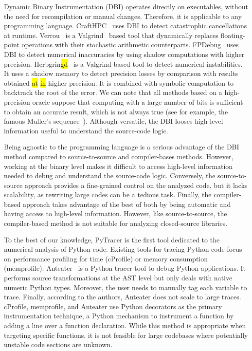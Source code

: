 \documentclass[10pt,journal,compsoc]{IEEEtran}
\newcommand{\pytracer}[0]{PyTracer\xspace}
\DeclareRobustCommand{\add}[1]{{\sethlcolor{lightgreen}\hl{#1}}}
\DeclareRobustCommand{\remove}[1]{{\sethlcolor{lightred}\hl{#1}}}
\begin{document}
Dynamic Binary Instrumentation (DBI) operates directly on executables, without
the need for recompilation or manual changes. Therefore, it is applicable to any
programming language. CraftHPC~\cite{lam2013dynamic} uses DBI to detect
catastrophic cancellations at runtime. Verrou~\cite{fevotte2016verrou} is a
Valgrind~\cite{nethercote2007valgrind} based tool that dynamically replaces
floating-point operations with their stochastic arithmetic counterparts.
FPDebug~\cite{benz2012dynamic} uses DBI to detect numerical inaccuracies by
using shadow computations with higher precision.
Herbgrin\remove{g}\add{d}~\cite{sanchez2017finding} is a Valgrind-based tool to detect numerical
instabilities. It uses a shadow memory to detect precision losses by comparison
with results obtained \remove{at} \add{in} higher precision. It is combined with symbolic
computation to backtrack the root of the error. We can note that all methods
based on a high-precision oracle suppose that computing with a large number of
bits is sufficient to obtain an accurate result, which is not always true (see
for example, the famous Muller's sequence~\cite{bajard1996introduction}).
Although versatile, the DBI looses high-level information useful to understand
the source-code logic.

Being agnostic to the programming language is a serious advantage of the DBI
method compared to source-to-source and compiler-bases methods. However, working
at the binary level makes it difficult to access high-level information needed
to debug and understand the source-code logic. Conversely, the source-to-source
approach provides a fine-grained control on the analyzed code, but it lacks
scalability, as rewriting large codes can be a tedious task. Finally, the
compiler-based approach takes advantage of the best of both by being automatic
and having access to high-level information. However, like source-to-source, the
compiler-based method is not suitable for analyzing closed-source libraries.

To the best of our knowledge, \pytracer is the first tool dedicated to the
numerical analysis of Python code. Existing tools for tracing Python code focus
on performance profiling for time (cProfile) or memory consumption (memprofile).
Anteater~\cite{faust2019anteater} is a Python tracer tool to debug Python
applications. It performs source transformations at the AST level but only deals
with native numeric Python types. Moreover, the user needs to manually tag each
variable to trace. Finally, according to the authors, Anteater does not scale to
large traces. cProfile, memprofile, and Anteater use Python decorators as the
primary instrumentation technique, a Python mechanism to instrument a function
by adding a line over a function declaration. While this method is appropriate
when targeting specific functions, it is not feasible for large codebases where
potentially unstable code sections are unknown.
\end{document}
